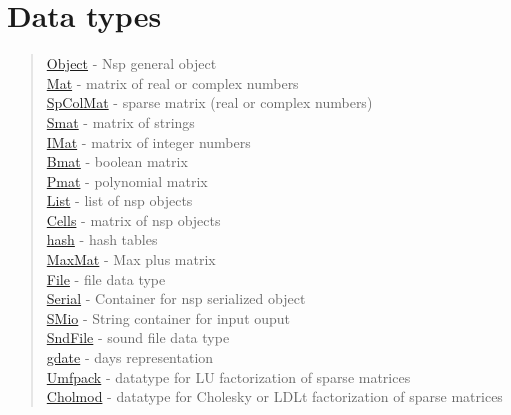 \chapter*{Data types}


\begin{quote}
\noindent
\hyperlink{Object}{Object} - Nsp general object  \\
\hyperlink{Mat}{Mat} - matrix of real or complex numbers \\
\hyperlink{SpColMat}{SpColMat} - sparse matrix (real or complex numbers) \\
\hyperlink{Smat}{Smat} - matrix of strings  \\
\hyperlink{IMat}{IMat} - matrix of integer numbers \\
\hyperlink{Bmat}{Bmat} - boolean matrix  \\
\hyperlink{Pmat}{Pmat} - polynomial matrix  \\
\hyperlink{list}{List} - list  of nsp objects  \\
\hyperlink{Cells}{Cells} - matrix of nsp objects  \\
\hyperlink{hash}{hash} - hash tables  \\
\hyperlink{MaxMat}{MaxMat} - Max plus matrix  \\
\hyperlink{File}{File} - file data type  \\
\hyperlink{Serial}{Serial} - Container for nsp serialized object \\
\hyperlink{SMio}{SMio} - String container for input ouput \\
\hyperlink{SndFile}{SndFile} - sound file data type \\
\hyperlink{gdate}{gdate} - days representation \\
\hyperlink{Umfpack}{Umfpack} - datatype for LU factorization of sparse matrices \\
\hyperlink{Cholmod}{Cholmod} - datatype for Cholesky or LDLt factorization of sparse matrices \\
\end{quote}





















